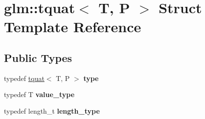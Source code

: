 \hypertarget{structglm_1_1tquat}{\section{glm\-:\-:tquat$<$ T, P $>$ Struct Template Reference}
\label{structglm_1_1tquat}
}
\subsection*{Public Types}
\begin{DoxyCompactItemize}
\item 
\hypertarget{structglm_1_1tquat_a5a7bf29e6af38b1b79e9f553fd85f3ec}{typedef \hyperlink{structglm_1_1tquat}{tquat}$<$ T, P $>$ {\bfseries type}}\label{structglm_1_1tquat_a5a7bf29e6af38b1b79e9f553fd85f3ec}

\item 
\hypertarget{structglm_1_1tquat_ab335d431872cb11fb3b5e2476adc32d8}{typedef T {\bfseries value\-\_\-type}}\label{structglm_1_1tquat_ab335d431872cb11fb3b5e2476adc32d8}

\item 
\hypertarget{structglm_1_1tquat_ab3ef67a20d129dcb01f042042218ba17}{typedef length\-\_\-t {\bfseries length\-\_\-type}}\label{structglm_1_1tquat_ab3ef67a20d129dcb01f042042218ba17}

\end{DoxyCompactItemize}
